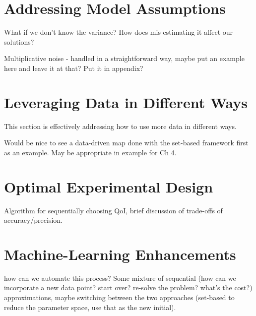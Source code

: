 \section{Addressing Model Assumptions}\label{sec:ch05-variance}

What if we don't know the variance? How does mis-estimating it affect our solutions?

Multiplicative noise - handled in a straightforward way, maybe put an example here and leave it at that? Put it in appendix?


\section{Leveraging Data in Different Ways}\label{sec:ch05-data}

This section is effectively addressing how to use more data in different ways.

Would be nice to see a data-driven map done with the set-based framework first as an example.
May be appropriate in example for Ch 4.

\section{Optimal Experimental Design}\label{sec:ch05-oed}

Algorithm for sequentially choosing QoI, brief discussion of trade-offs of accuracy/precision.

\section{Machine-Learning Enhancements}\label{sec:ch05-ml}

how can we automate this process? Some mixture of sequential (how can we incorporate a new data point? start over? re-solve the problem? what's the cost?) approximations, maybe switching between the two approaches (set-based to reduce the parameter space, use that as the new initial).
